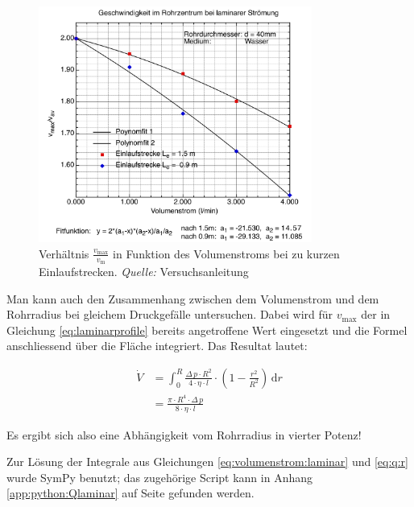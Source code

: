 \begin{figure}[h!t]
    \centering
    \includegraphics[width=0.8\textwidth]{images/einlauf.png}
    \caption{%
        Verh\"altnis  $\frac{v_{\mathrm{max}}}{v_{\mathrm{m}}}$   in  Funktion
        des     Volumenstroms      bei     zu      kurzen     Einlaufstrecken.
        \emph{Quelle:} Versuchsanleitung
    }
    \label{fig:einlauf}
\end{figure}

Man kann  auch den Zusammenhang  zwischen dem Volumenstrom und  dem Rohrradius
bei gleichem  Druckgef\"alle untersuchen. Dabei wird  f\"ur $v_{\mathrm{max}}$
der in Gleichung \ref{eq:laminarprofile}  bereits angetroffene Wert eingesetzt
und  die Formel  anschliessend  \"uber die  Fl\"ache integriert. Das  Resultat
lautet:

\begin{equation}
    \label{eq:q:r}
    \begin{split}
        \dot{V} &= \int_{0}^R \frac{\Delta\,p \cdot R^2}{4 \cdot \eta \cdot l} \cdot \left( 1 - \frac{r^2}{R^2} \right) \, \mathrm{d}r \\
                &= \frac{\pi \cdot R^4 \cdot \Delta \, p}{8 \cdot \eta \cdot l}
    \end{split}
\end{equation}

Es ergibt sich also eine Abh\"angigkeit vom Rohrradius in vierter Potenz!

Zur L\"osung  der Integrale aus Gleichungen  \ref{eq:volumenstrom:laminar} und
\ref{eq:q:r}  wurde SymPy  benutzt;  das zugeh\"orige  Script  kann in  Anhang
\ref{app:python:Qlaminar}  auf  Seite  \pageref{app:python:Qlaminar}  gefunden
werden.

